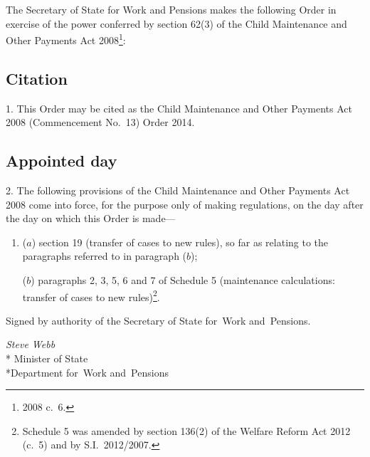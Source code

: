 \documentclass[12pt,a4paper]{article}
\title{\regstitle}
\author{S.I.\ 2014 No.\ 576 (C.~24)}
\date{Made
8th March 2014
}
\begin{document}
\maketitle

\enlargethispage{\baselineskip}

\noindent
The Secretary of State for Work and Pensions makes the following Order in exercise of the power conferred by section 62(3) of the Child Maintenance and Other Payments Act 2008\footnote{2008 c.~6.}: 

{\sloppy

\tableofcontents

}

\bigskip

\setcounter{secnumdepth}{-2}

\subsection[1. Citation]{Citation}

1.  This Order may be cited as the Child Maintenance and Other Payments Act 2008 (Commencement No.~13) Order 2014.

\subsection[2. Appointed day]{Appointed day}

2.  The following provisions of the Child Maintenance and Other Payments Act 2008 come into force, for the purpose only of making regulations, on the day after the day on which this Order is made—
\begin{enumerate}\item[]
($a$) section 19 (transfer of cases to new rules), so far as relating to the paragraphs referred to in paragraph ($b$);

($b$) paragraphs 2, 3, 5, 6 and 7 of Schedule 5 (maintenance calculations: transfer of cases to new rules)\footnote{Schedule 5 was amended by section 136(2) of the Welfare Reform Act 2012 (c.~5) and by S.I.~2012/2007.}.
\end{enumerate}

\bigskip

\pagebreak[3]

Signed 
by authority of the 
Secretary of State for~Work and~Pensions.

{\raggedleft
\emph{Steve Webb}\\*
Minister
of State\\*Department 
for~Work and~Pensions

}
\end{document}
